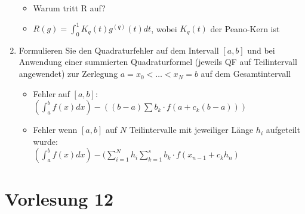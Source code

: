 \documentclass[]{article}
\begin{document}
\begin{enumerate}
			\begin{itemize}
				\item Warum tritt R auf? %
				\item $R(g) = \int_0^1 K_q(t) g^{(q)}(t) dt$, wobei $K_q(t)$ der Peano-Kern ist
			\end{itemize}
		\item Formulieren Sie den Quadraturfehler auf dem Intervall $[a,b]$ und bei Anwendung einer summierten Quadraturformel (jeweils QF auf Teilintervall angewendet) zur Zerlegung $a = x_0 < \dots < x_N = b$ auf dem Gesamtintervall
			\begin{itemize}
				\item Fehler auf $[a,b]$: \\
						$( \int_a^b f(x) dx ) - ( (b-a)\sum b_k \cdot f(a+c_k(b-a)))$
				\item Fehler wenn $[a,b]$ auf $N$ Teilintervalle mit jeweiliger Länge $h_i$ aufgeteilt wurde: \\
						$( \int_a^b f(x) dx ) - ( \sum_{i=1}^N h_i \sum_{k=1}^s b_k \cdot f(x_{n-1} + c_k h_n )$ 
			\end{itemize}
	\end{enumerate}

\section{Vorlesung 12}
\end{document}

